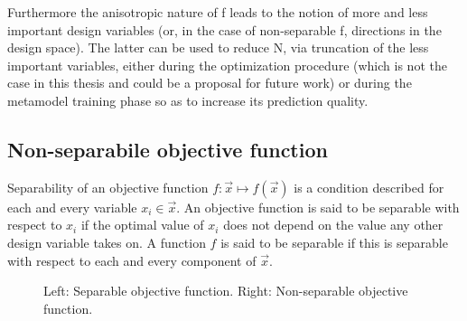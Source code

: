 Furthermore the anisotropic nature of f leads to the notion of more and less important design variables (or, in the case of non-separable f, directions in the design space). The latter can be used to reduce N, via truncation of the less important variables, either during the optimization procedure (which is not the case in this thesis and could be a proposal for future work) or during the metamodel training phase so as to increase its prediction quality.       


\subsection{Non-separabile objective function}     
\label{Nonsep}
Separability of an objective function $f:\vec{x}\mapsto f(\vec{x})$ is a condition described for each and every variable $x_i \in \vec{x}$. An objective function is said to be separable with respect to $x_i$ if the optimal value of $x_i$ does not depend on the value  any other design variable takes on. A function $f$ is said to be separable if this is separable with respect to each and every component of $\vec{x}$.


\begin{figure}[h!]
\begin{minipage}[b]{1\linewidth}
 \centering
\end{minipage}
\caption{Left: Separable objective function. Right: Non-separable objective function.} 
\label{nonsep}
\end{figure}

